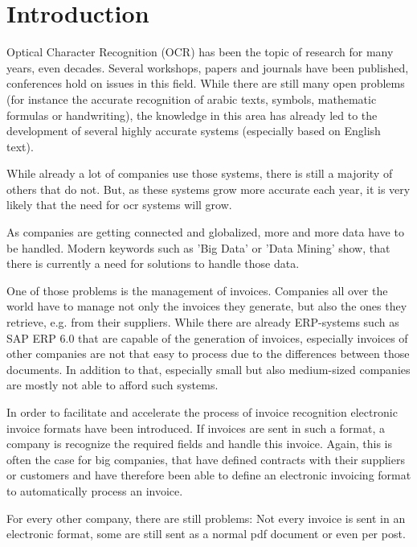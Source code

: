 %
% 

\chapter{Introduction}
Optical Character Recognition (OCR) has been the topic of research for many years, even decades. Several workshops, papers and journals have been published, conferences hold on issues in this field. While there are still many open problems (for instance the accurate recognition of arabic texts, symbols, mathematic formulas or handwriting), the knowledge in this area has already led to the development of several highly accurate systems (especially based on English text).

While already a lot of companies use those systems, there is still a majority of others that do not. But, as these systems grow more accurate each year, it is very likely that the need for ocr systems will grow. \par
As companies are getting connected and globalized, more and more data have to be handled. Modern keywords such as 'Big Data' or 'Data Mining' show, that there is currently a need for solutions to handle those data.

One of those problems is the management of invoices. Companies all over the world have to manage not only the invoices they generate, but also the ones they retrieve, e.g. from their suppliers. While there are already ERP-systems such as SAP ERP 6.0 that are capable of the generation of invoices, especially invoices of other companies are not that easy to process due to the differences between those documents. In addition to that, especially small but also medium-sized companies are mostly not able to afford such systems. 

In order to facilitate and accelerate the process of invoice recognition electronic invoice formats have been introduced. If invoices are sent in such a format, a company is recognize the required fields and handle this invoice. Again, this is often the case for big companies, that have defined contracts with their suppliers or customers and have therefore been able to define an electronic invoicing format to automatically process an invoice.

For every other company, there are still problems: Not every invoice is sent in an electronic format, some are still sent as a normal pdf document or even per post.

